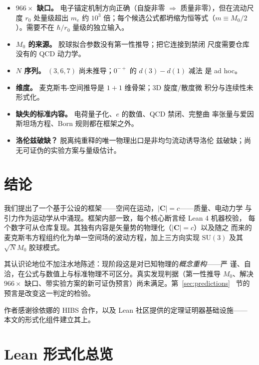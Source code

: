 \documentclass[aps,prd,preprint,superscriptaddress,amsmath,amssymb]{revtex4-2}
\begin{document}
\begin{itemize}
  \item \textbf{$966\times$ 缺口。} 电子锚定机制方向正确（自旋非零
  $\Rightarrow$ 质量非零），但在流动尺度 $r_0$ 处量级超出 $m_e$ 约
  $10^3$ 倍；每个候选公式都坍缩为恒等式（$m\equiv M_0/2$）。需要不在
  $\hbar/r_0$ 量级的独立输入。
  \item \textbf{$M_0$ 的来源。} 胶球拟合参数没有第一性推导；把它连接到禁闭
  尺度需要仓库没有的 QCD 动力学。
  \item \textbf{$N$ 序列。} $(3,6,7)$ 尚未推导；$0^{-+}$ 的 $d(3)-d(1)$ 减法
  是 ad hoc。
  \item \textbf{维度。} 麦克斯韦-空间推导是 $1{+}1$ 维骨架；3D 旋度/散度微
  积分与连续性未形式化。
  \item \textbf{缺失的标准内容。} 电荷量子化、$e$ 的数值、QCD 禁闭、完整曲
  率张量与爱因斯坦场方程、Born 规则都在框架之外。
  \item \textbf{洛伦兹破缺？} 脱离纯重释的唯一物理出口是非均匀流动诱导洛伦
  兹破缺；尚无可证伪的实验方案与量级估计。
\end{itemize}

\section{结论}\label{sec:conclusion}

我们提出了一个基于公设的框架——空间在运动，$|\bm{C}|=c$——质量、电动力学
与引力作为运动学从中涌现。框架内部一致，每个核心断言经 Lean 4 机器校验，
每个数字可从仓库复现。其独有内容是矢量势的物理化（$|\bm{C}|=c$）以及随之
而来的麦克斯韦方程组约化为单一空间场的波动方程，加上三方向实现
$\mathrm{SU}(3)$ 及其 $\sqrt{N}M_0$ 胶球模式。

其认识论地位不加注水地陈述：现阶段这是对已知物理的\emph{概念重构}——严
谨、自洽，在公式与数值上与标准物理不可区分。真实发现判据（第一性推导
$M_0$、解决 $966\times$ 缺口、带实验方案的新可证伪预言）尚未满足。第~\ref{sec:predictions}~
节的预言是改变这一判定的检验。

\begin{acknowledgments}
作者感谢徐依娜的 HIBS 合作，以及 Lean 社区提供的定理证明器基础设施——
本文的形式化组件建立其上。
\end{acknowledgments}



\appendix

\section{Lean 形式化总览}\label{app:lean}
\end{document}
